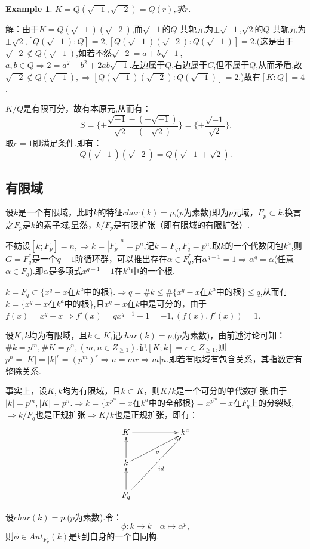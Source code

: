 \documentclass[UTF8]{article}
\newtheorem{exa}{Example}[section]
\begin{document}
\begin{exa}
$K=Q(\sqrt{-1},\sqrt{-2})=Q(r)$,求$r$.
\end{exa}
解：由于$K=Q(\sqrt{-1})(\sqrt{-2})$,而$\sqrt{-1}$的$Q$-共轭元为$\pm \sqrt{-1}$,$\sqrt{2}$的$Q$-共轭元为$\pm \sqrt{2}$,$[Q(\sqrt{-1}):Q]=2,[Q(\sqrt{-1})(\sqrt{-2}):Q(\sqrt{-1})]=2$.(这是由于$\sqrt{-2}\notin Q(\sqrt{-1})$,如若不然$\sqrt{-2}=a+ b\sqrt{-1}$,$a,b\in Q\Rightarrow 2=a^2-b^2+2ab\sqrt{-1}.$左边属于$Q$,右边属于$C$,但不属于$Q$,从而矛盾,故$\sqrt{-2}\notin Q(\sqrt{-1}),\Rightarrow [Q(\sqrt{-1})(\sqrt{-2}):Q(\sqrt{-1})]=2$.)故有$[K:Q]=4$.

$K/Q$是有限可分，故有本原元,从而有：$$S=\{\pm\frac{\sqrt{-1}-(-\sqrt{-1})}{\sqrt{2}-(-\sqrt{2})}\}=\{\pm\frac{\sqrt{-1}}{\sqrt{2}}\}.$$取$c=1$即满足条件.即有：$$Q(\sqrt{-1})(\sqrt{-2})=Q(\sqrt{-1}+\sqrt{2}).$$

\subsection{有限域}
\normalsize

设$k$是一个有限域，此时$k$的特征$char(k)=p$,($p$为素数)即为$p$元域，$F_p\subset k$.换言之$F_p$是$k$的素子域,显然，$k/F_p$是有限扩张（即有限域的有限扩张）.

不妨设$[k;F_p]=n,\Rightarrow k=|F_p|^n=p^n$,记$k=F_q,F_q=p^n$.取$k$的一个代数闭包$k^a$,则$G=F_q^*$是一个$q-1$阶循环群，可以推出存在$\alpha\in F_q^*$,有$\alpha^{q-1}=1\Rightarrow \alpha^q=\alpha$(任意$\alpha\in F_q$).即$\alpha$是多项式$x^{q-1}-1$在$k^a$中的一个根.

$k=F_q\subset \{x^q-x$在$k^a$中的根\}.$\Rightarrow q=\# k\le \#\{x^q-x$在$k^a$中的根$\}\le q$,从而有$k=\{x^q-x$在$k^a$中的根\},且$x^q-x$在$k$中是可分的，由于$f(x)=x^q-x\Rightarrow f'(x)=qx^{q-1}-1=-1,(f(x),f'(x))=1$.

设$K,k$均为有限域，且$k\subset K$,记$char(k)=p$,($p$为素数)，由前述讨论可知：$\#k=p^m,\#K=p^n,(m,n\in Z_{\ge 1})$.记$[K;k]=r\in Z_{\ge 1}$,则$p^n=|K|=|k|^r=(p^m)^r\Rightarrow n=mr\Rightarrow m|n$.即若有限域有包含关系，其指数定有整除关系.

事实上，设$K,k$均为有限域，且$k\subset K$，则$K/k$是一个可分的单代数扩张.由于$|k|=p^m,|K|=p^n.\Rightarrow k=\{x^{p^m}-x$在$k^a$中的全部根$\}=x^{p^m}-x$在$F_q$上的分裂域,$\Rightarrow k/F_q$也是正规扩张$\Rightarrow K/k$也是正规扩张，即有：$$
\xymatrix{K\ar[rr]&&k^a\\k\ar[u]\ar[rru]_{\sigma}&\\F_q\ar[u]\ar[rruu]_{id}& }$$

设$char(k)=p$,($p$为素数).令：$$\phi:k\rightarrow k\quad \alpha\mapsto \alpha^p,$$则$\phi \in Aut_{F_p}(k)$是$k$到自身的一个自同构.
\end{document}
